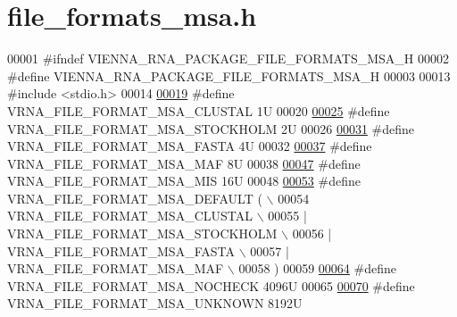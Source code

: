 \hypertarget{file__formats__msa_8h_source}{}\section{file\+\_\+formats\+\_\+msa.\+h}
\label{file__formats__msa_8h_source}

\begin{DoxyCode}
00001 \textcolor{preprocessor}{#ifndef VIENNA\_RNA\_PACKAGE\_FILE\_FORMATS\_MSA\_H}
00002 \textcolor{preprocessor}{#define VIENNA\_RNA\_PACKAGE\_FILE\_FORMATS\_MSA\_H}
00003 
00013 \textcolor{preprocessor}{#include <stdio.h>}
00014 
\hyperlink{group__file__utils_ga79a23de2c7249f2cccd762e475c81859}{00019} \textcolor{preprocessor}{#define VRNA\_FILE\_FORMAT\_MSA\_CLUSTAL      1U}
00020 
\hyperlink{group__file__utils_ga62be992445cd8ab2ad7a8fded944338b}{00025} \textcolor{preprocessor}{#define VRNA\_FILE\_FORMAT\_MSA\_STOCKHOLM    2U}
00026 
\hyperlink{group__file__utils_gacf6274a2c825f34e4131404665b00604}{00031} \textcolor{preprocessor}{#define VRNA\_FILE\_FORMAT\_MSA\_FASTA        4U}
00032 
\hyperlink{group__file__utils_gab3186d774c01570d2a47d0308eec4927}{00037} \textcolor{preprocessor}{#define VRNA\_FILE\_FORMAT\_MSA\_MAF          8U}
00038 
\hyperlink{group__file__utils_ga494488a771aa0c602fb4cf445be34d47}{00047} \textcolor{preprocessor}{#define VRNA\_FILE\_FORMAT\_MSA\_MIS          16U}
00048 
\hyperlink{group__file__utils_ga4acc255373831856a8417b68de8a94c0}{00053} \textcolor{preprocessor}{#define VRNA\_FILE\_FORMAT\_MSA\_DEFAULT      ( \(\backslash\)}
00054 \textcolor{preprocessor}{    VRNA\_FILE\_FORMAT\_MSA\_CLUSTAL \(\backslash\)}
00055 \textcolor{preprocessor}{    | VRNA\_FILE\_FORMAT\_MSA\_STOCKHOLM \(\backslash\)}
00056 \textcolor{preprocessor}{    | VRNA\_FILE\_FORMAT\_MSA\_FASTA \(\backslash\)}
00057 \textcolor{preprocessor}{    | VRNA\_FILE\_FORMAT\_MSA\_MAF \(\backslash\)}
00058 \textcolor{preprocessor}{    )}
00059 
\hyperlink{group__file__utils_ga229fb3778ecabea4782902b69fa48fd1}{00064} \textcolor{preprocessor}{#define VRNA\_FILE\_FORMAT\_MSA\_NOCHECK      4096U}
00065 
\hyperlink{group__file__utils_gabdc948f547e550125de3e7c65878400c}{00070} \textcolor{preprocessor}{#define VRNA\_FILE\_FORMAT\_MSA\_UNKNOWN      8192U}

\end{DoxyCode}

